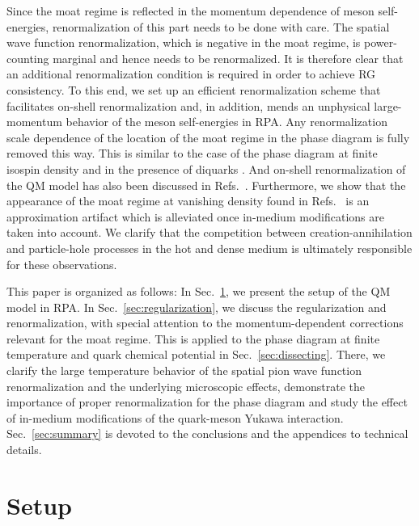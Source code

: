 \documentclass[reprint,english,superscriptaddress,preprintnumbers,amsmath,amssymb,aps,prd]{revtex4-2}
\def\Sec#1{Sec.~\ref{#1}}
\begin{document}
Since the moat regime is reflected in the momentum dependence of meson self-energies, renormalization of this part needs to be done with care. The spatial wave function renormalization, which is negative in the moat regime, is power-counting marginal and hence needs to be renormalized. It is therefore clear that an additional renormalization condition is required in order to achieve RG consistency. To this end, we set up an efficient renormalization scheme that facilitates on-shell renormalization and, in addition, mends an unphysical large-momentum behavior of the meson self-energies in RPA. Any renormalization scale dependence of the location of the moat regime in the phase diagram is fully removed this way. This is similar to the case of the phase diagram at finite isospin density \cite{Brandt:2025tkg} and in the presence of diquarks \cite{Gholami:2025afm}. And on-shell renormalization of the QM model has also been discussed in Refs.\ \cite{Carignano:2014jla, Carignano:2016jnw, Adhikari:2016eef, Adhikari:2017ydi, Buballa:2020xaa, Rai:2022wth}.
Furthermore, we show that the appearance of the moat regime at vanishing density found in Refs.\ \cite{Topfel:2024iop, Cao:2025zvh} is an approximation artifact which is alleviated once in-medium modifications are taken into account. We clarify that the competition between creation-annihilation and particle-hole processes in the hot and dense medium is ultimately responsible for these observations.

This paper is organized as follows:  In \Sec{sec:LEFT}, we present the setup of the QM model in RPA. In \Sec{sec:regularization}, we discuss the regularization and renormalization, with special attention to the momentum-dependent corrections relevant for the moat regime. This is applied to the phase diagram at finite temperature and quark chemical potential in \Sec{sec:dissecting}. There, we clarify the large temperature behavior of the spatial pion wave function renormalization and the underlying microscopic effects, demonstrate the importance of proper renormalization for the phase diagram and study the effect of in-medium modifications of the quark-meson Yukawa interaction. \Sec{sec:summary} is devoted to the conclusions and the appendices to technical details.

\section{Setup}\label{sec:LEFT}
\end{document}

